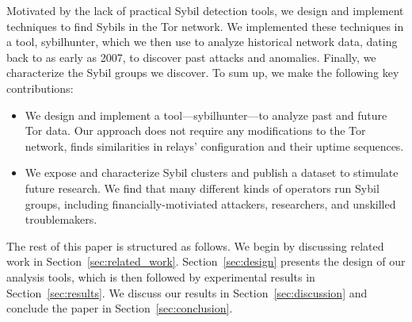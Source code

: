 Motivated by the lack of practical Sybil detection tools, we design and
implement techniques to find Sybils in the Tor network.  We implemented these
techniques in a tool, sybilhunter, which we then use to analyze historical
network data, dating back to as early as 2007, to discover past attacks and
anomalies.  Finally, we characterize the Sybil groups we discover.  To sum up,
we make the following key contributions:
\begin{itemize}
	\item We design and implement a tool---sybilhunter---to analyze past and
		future Tor data.  Our approach does not require any modifications to the
		Tor network, finds similarities in relays' configuration and their
		uptime sequences.
	\item We expose and characterize Sybil clusters and publish a dataset to
		stimulate future research.  We find that many different kinds of
		operators run Sybil groups, including financially-motiviated attackers,
		researchers, and unskilled troublemakers.
\end{itemize}

The rest of this paper is structured as follows.  We begin by discussing
related work in Section~\ref{sec:related_work}.  Section~\ref{sec:design}
presents the design of our analysis tools, which is then followed by
experimental results in Section~\ref{sec:results}.  We discuss our results in
Section~\ref{sec:discussion} and conclude the paper in
Section~\ref{sec:conclusion}.
